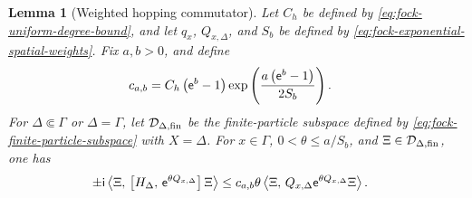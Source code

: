 \documentclass[11pt,a4paper]{article}
\theoremstyle{plain}
\newtheorem{lem}[thm]{Lemma}
\theoremstyle{definition}
\theoremstyle{remark}
\begin{document}
\begin{lem}[Weighted hopping commutator]
Let $C_h$ be defined by \eqref{eq:fock-uniform-degree-bound}, and let
$q_x$, $Q_{x,\Delta}$, and $S_b$ be defined by
\eqref{eq:fock-exponential-spatial-weights}.
Fix $a,b>0$, and define
\begin{equation}
\begin{aligned}
c_{a,b}
& =
C_h\left( \mathsf{e}^b-1 \right)
\exp \left( \frac{a\left( \mathsf{e}^b-1 \right)}{2S_b} \right).
\end{aligned}
\label{eq:fock-weighted-commutator-constant}
\end{equation}
For $\Delta\Subset\Gamma$ or $\Delta=\Gamma$, let
$\sphilb{D}_{\Delta,\txtfin}$ be the finite-particle subspace defined by
\eqref{eq:fock-finite-particle-subspace} with $X=\Delta$.
For $x\in\Gamma$, $0<\theta\leq a/S_b$, and
$\Xi\in\sphilb{D}_{\Delta,\txtfin}$, one has
\begin{equation}
\begin{aligned}
\mathord{\pm}\imunit
\bkt{\Xi}{
\commutator{H_{\Delta}}{\napiernum^{\theta Q_{x,\Delta}}}\Xi}
& \leq
c_{a,b}\theta
\bkt{\Xi}{Q_{x,\Delta}\napiernum^{\theta Q_{x,\Delta}}\Xi}.
\end{aligned}
\label{eq:fock-weighted-exponential-commutator}
\end{equation}
\end{lem}
\end{document}
